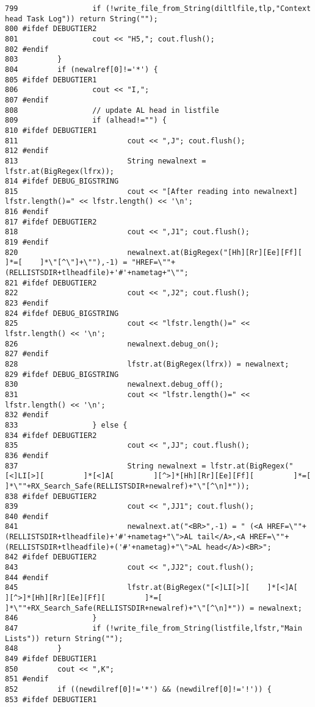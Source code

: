 \begin{verbatim}
799                 if (!write_file_from_String(diltlfile,tlp,"Context head Task Log")) return String("");
800 #ifdef DEBUGTIER2
801                 cout << "H5,"; cout.flush();
802 #endif
803         }
804         if (newalref[0]!='*') {
805 #ifdef DEBUGTIER1
806                 cout << "I,";
807 #endif
808                 // update AL head in listfile
809                 if (alhead!="") {
810 #ifdef DEBUGTIER1
811                         cout << ",J"; cout.flush();
812 #endif
813                         String newalnext = lfstr.at(BigRegex(lfrx));
814 #ifdef DEBUG_BIGSTRING
815                         cout << "[After reading into newalnext] lfstr.length()=" << lfstr.length() << '\n';
816 #endif
817 #ifdef DEBUGTIER2
818                         cout << ",J1"; cout.flush();
819 #endif
820                         newalnext.at(BigRegex("[Hh][Rr][Ee][Ff][        ]*=[    ]*\"[^\"]+\""),-1) = "HREF=\""+(RELLISTSDIR+tlheadfile)+'#'+nametag+"\"";
821 #ifdef DEBUGTIER2
822                         cout << ",J2"; cout.flush();
823 #endif
824 #ifdef DEBUG_BIGSTRING
825                         cout << "lfstr.length()=" << lfstr.length() << '\n';
826                         newalnext.debug_on();
827 #endif
828                         lfstr.at(BigRegex(lfrx)) = newalnext;
829 #ifdef DEBUG_BIGSTRING
830                         newalnext.debug_off();
831                         cout << "lfstr.length()=" << lfstr.length() << '\n';
832 #endif
833                 } else {
834 #ifdef DEBUGTIER2
835                         cout << ",JJ"; cout.flush();
836 #endif
837                         String newalnext = lfstr.at(BigRegex("[<]LI[>][         ]*[<]A[         ][^>]*[Hh][Rr][Ee][Ff][         ]*=[    ]*\""+RX_Search_Safe(RELLISTSDIR+newalref)+"\"[^\n]*"));
838 #ifdef DEBUGTIER2
839                         cout << ",JJ1"; cout.flush();
840 #endif
841                         newalnext.at("<BR>",-1) = " (<A HREF=\""+(RELLISTSDIR+tlheadfile)+'#'+nametag+"\">AL tail</A>,<A HREF=\""+(RELLISTSDIR+tlheadfile)+('#'+nametag)+"\">AL head</A>)<BR>";
842 #ifdef DEBUGTIER2
843                         cout << ",JJ2"; cout.flush();
844 #endif
845                         lfstr.at(BigRegex("[<]LI[>][    ]*[<]A[         ][^>]*[Hh][Rr][Ee][Ff][         ]*=[    ]*\""+RX_Search_Safe(RELLISTSDIR+newalref)+"\"[^\n]*")) = newalnext;
846                 }
847                 if (!write_file_from_String(listfile,lfstr,"Main Lists")) return String("");
848         }
849 #ifdef DEBUGTIER1
850         cout << ",K";
851 #endif
852         if ((newdilref[0]!='*') && (newdilref[0]!='!')) {
853 #ifdef DEBUGTIER1

\end{verbatim}
